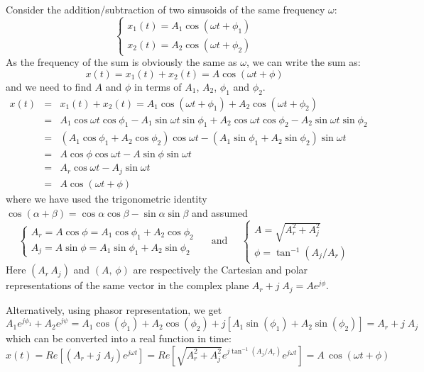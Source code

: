 \documentclass{article}
\begin{document}
Consider the addition/subtraction of two sinusoids of the same frequency 
$\omega$:
\begin{equation} 
  \left\{ \begin{array}{l} x_1(t)=A_1\cos(\omega t+\phi_1)\\
    x_2(t)=A_2\cos(\omega t+\phi_2) \end{array} \right. 
\end{equation}
As the frequency of the sum is obviously the same as $\omega$, we can write
the sum as:
\begin{equation}
  x(t)=x_1(t)+x_2(t)=A\cos(\omega t+\phi) 
\end{equation}
and we need to find $A$ and $\phi$ in terms of $A_1$, $A_2$, $\phi_1$ and 
$\phi_2$.
\begin{eqnarray}
  x(t)&=&x_1(t)+x_2(t)=A_1\cos(\omega t+\phi_1)+A_2\cos(\omega t+\phi_2)
  \nonumber \\
  &=&A_1\cos\omega t\cos\phi_1-A_1\sin\omega t\sin\phi_1
  +A_2\cos\omega t\cos\phi_2-A_2\sin\omega t\sin\phi_2
  \nonumber \\
  &=&(A_1\cos\phi_1+A_2\cos\phi_2)\cos\omega t
  -(A_1\sin\phi_1+A_2\sin\phi_2)\sin\omega t
  \nonumber \\
  &=&A\cos\phi\cos\omega t-A\sin\phi\sin\omega t
  \nonumber \\
  &=&A_r\cos\omega t-A_j\sin\omega t
  \nonumber \\
  &=&A \cos(\omega t+\phi) 
\end{eqnarray}
where we have used the trigonometric identity 
$\cos(\alpha+\beta)=\cos\alpha\cos\beta-\sin\alpha\sin\beta$
and assumed
\begin{equation} 
  \left\{ \begin{array}{l} A_r=A\cos\phi =A_1 \cos\phi_1+A_2 \cos\phi_2\\
    A_j=A\sin\phi =A_1\sin\phi_1+A_2\sin\phi_2\end{array} \right. 
    \;\;\;\;\;\mbox{and}\;\;\;\;\;
    \left\{ \begin{array}{l} A=\sqrt{A^2_r+A^2_j}\\
      \phi=\tan^{-1} (A_j/A_r) \end{array} \right. 
\end{equation}
Here $(A_r\,A_j)$ and $(A,\,\phi)$ are respectively the Cartesian and polar 
representations of the same vector in the complex plane $A_r+j\;A_j=A e^{j\phi}$.

Alternatively, using phasor representation, we get
\begin{equation}
  A_1 e^{j\phi_1}+A_2 e^{j\psi}
  =A_1\cos(\phi_1)+A_2\cos(\phi_2)+j [A_1\sin(\phi_1)+A_2\sin(\phi_2)]
  =A_r+j\;A_j
\end{equation}
which can be converted into a real function in time:
\begin{equation}
  x(t)=Re[ ( A_r+j\;A_j ) e^{j\omega t} ]
  =Re\left[ \sqrt{A_r^2+A_j^2} e^{j\tan^{-1}(A_j/A_r)} e^{j\omega t}\right]
  =A\,\cos(\omega t+\phi)
\end{equation}
\end{document}
